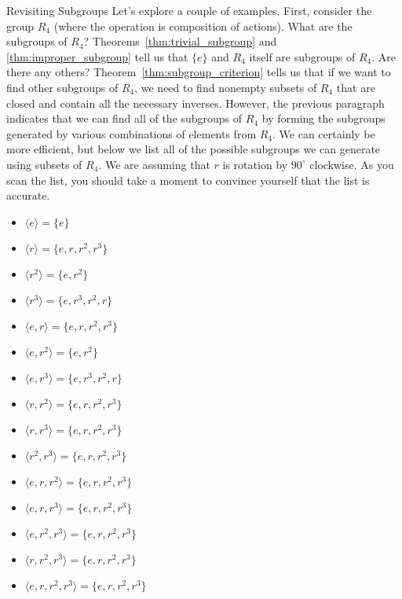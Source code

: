 \begin{section}{Revisiting Subgroups}
Let's explore a couple of examples.  First, consider the group $R_4$ (where the operation is composition of actions).  What are the subgroups of $R_4$?  Theorems~\ref{thm:trivial_subgroup} and \ref{thm:improper_subgroup} tell us that $\{e\}$ and $R_4$ itself are subgroups of $R_4$.  Are there any others?  Theorem~\ref{thm:subgroup_criterion} tells us that if we want to find other subgroups of $R_4$, we need to find nonempty subsets of $R_4$ that are closed and contain all the necessary inverses.  However, the previous paragraph indicates that we can find all of the subgroups of $R_4$ by forming the subgroups generated by various combinations of elements from $R_4$.  We can certainly be more efficient, but below we list all of the possible subgroups we can generate using subsets of $R_4$.  We are assuming that $r$ is rotation by $90^{\circ}$ clockwise.  As you scan the list, you should take a moment to convince yourself that the list is accurate.
\begin{multicols}{2}
\begin{itemize}
\item[] $\langle e \rangle = \{e\}$
\item[] $\langle r \rangle  = \{e,r,r^2,r^3\}$
\item[] $\langle r^2 \rangle  = \{e,r^2\}$
\item[] $\langle r^3 \rangle  = \{e,r^3,r^2,r\}$
\item[] $\langle e,r \rangle  = \{e,r,r^2,r^3\}$
\item[] $\langle e,r^2 \rangle  = \{e,r^2\}$
\item[] $\langle e,r^3 \rangle  = \{e,r^3,r^2,r\}$
\item[] $\langle r,r^2 \rangle  = \{e,r,r^2,r^3\}$
\item[] $\langle r,r^3 \rangle  = \{e,r,r^2,r^3\}$
\item[] $\langle r^2,r^3 \rangle  = \{e,r,r^2,r^3\}$
\item[] $\langle e,r,r^2 \rangle  = \{e,r,r^2,r^3\}$
\item[] $\langle e,r,r^3 \rangle  = \{e,r,r^2,r^3\}$
\item[] $\langle e,r^2,r^3 \rangle  = \{e,r,r^2,r^3\}$
\item[] $\langle r,r^2,r^3 \rangle  = \{e,r,r^2,r^3\}$
\item[] $\langle e,r,r^2,r^3 \rangle = \{e,r,r^2,r^3\}$
\end{itemize}
\end{multicols}

\end{section}
